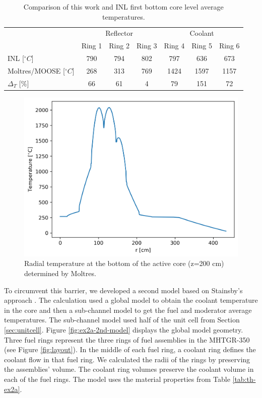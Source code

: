 \begin{table}[htbp!]
\centering
      \caption{Comparison of this work and INL \cite{strydom_inl_2013} first bottom core level average temperatures.}
      \label{tab:th-ex2a-1st-results}
\begin{tabular}{lcccccc}
    \toprule
                & \multicolumn{3}{c}{Reflector} & \multicolumn{3}{c}{Coolant}   \\
                & Ring 1   & Ring 2   & Ring 3   & Ring 4   & Ring 5  & Ring 6  \\
    \midrule
INL [$^{\circ}C$]           & 790    & 794     & 802     & 797     & 636     & 673     \\
Moltres/MOOSE [$^{\circ}C$] & 268    & 313     & 769     & 1424    & 1597    & 1157    \\
$\Delta_T$ [\%]    & 66       & 61     & 4       & 79      & 151     & 72      \\
    \bottomrule
  \end{tabular}
\end{table}

\begin{figure}[htbp!]
  \centering
  \includegraphics[width=0.45\linewidth]{figures-thermal/ex2a-across}
  \hfill
  \caption{Radial temperature at the bottom of the active core (z=200 cm) determined by Moltres.}
  \label{fig:ex2a-1st-model-across}
\end{figure}

To circumvent this barrier, we developed a second model based on Stainsby's approach \cite{stainsby_investigation_2008}.
The calculation used a global model to obtain the coolant temperature in the core and then a sub-channel model to get the fuel and moderator average temperatures.
The sub-channel model used half of the unit cell from Section \ref{sec:unitcell}.
Figure \ref{fig:ex2a-2nd-model} displays the global model geometry.
Three fuel rings represent the three rings of fuel assemblies in the MHTGR-350 (see Figure \ref{fig:layout}).
In the middle of each fuel ring, a coolant ring defines the coolant flow in that fuel ring.
We calculated the radii of the rings by preserving the assemblies' volume.
The coolant ring volumes preserve the coolant volume in each of the fuel rings.
The model uses the material properties from Table \ref{tab:th-ex2a}.

